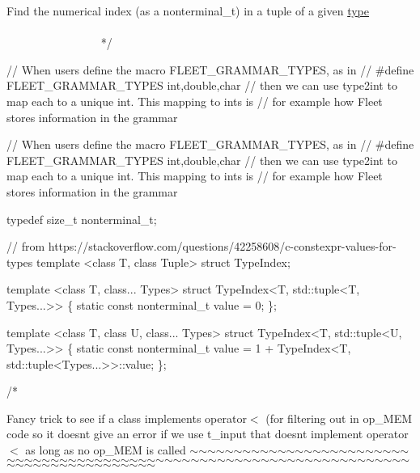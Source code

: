 \begin{DoxyCode}
    Find the numerical index (as a nonterminal\_t) in a tuple of a given \hyperlink{structhas__operator__lessthan__impl_a94158125949ce4db0eefedbdc4cbad73}{type}
   ~~~~~~~~~~~~~~~~~~~~~~~~~~~~~~~~~~~~~~~~~~~~~~~~~~~~~~~~~~~~~~~~~~~~~~~~~~~~~~~~~~~~~~~~ */

\textcolor{comment}{// When users define the macro FLEET\_GRAMMAR\_TYPES, as in }
\textcolor{comment}{// #define FLEET\_GRAMMAR\_TYPES int,double,char}
\textcolor{comment}{// then we can use type2int to map each to a unique int. This mapping to ints is}
\textcolor{comment}{// for example how Fleet stores information in the grammar}

\textcolor{comment}{// When users define the macro FLEET\_GRAMMAR\_TYPES, as in }
\textcolor{comment}{// #define FLEET\_GRAMMAR\_TYPES int,double,char}
\textcolor{comment}{// then we can use type2int to map each to a unique int. This mapping to ints is}
\textcolor{comment}{// for example how Fleet stores information in the grammar}

\textcolor{keyword}{typedef} \textcolor{keywordtype}{size\_t} nonterminal\_t;

\textcolor{comment}{// from https://stackoverflow.com/questions/42258608/c-constexpr-values-for-types}
\textcolor{keyword}{template} <\textcolor{keyword}{class} T, \textcolor{keyword}{class} Tuple>
\textcolor{keyword}{struct }TypeIndex;

\textcolor{keyword}{template} <\textcolor{keyword}{class }T, \textcolor{keyword}{class}... Types>
\textcolor{keyword}{struct }TypeIndex<T, std::tuple<T, Types...>> \{
    \textcolor{keyword}{static} \textcolor{keyword}{const} nonterminal\_t value = 0;
\};

\textcolor{keyword}{template} <\textcolor{keyword}{class }T, \textcolor{keyword}{class }U, \textcolor{keyword}{class}... Types>
\textcolor{keyword}{struct }TypeIndex<T, std::tuple<U, Types...>> \{
    \textcolor{keyword}{static} \textcolor{keyword}{const} nonterminal\_t value = 1 + TypeIndex<T, std::tuple<Types...>>::value;
\};

\textcolor{comment}{/*}
\end{DoxyCode}
 Fancy trick to see if a class implements operator$<$ (for filtering out in op\+\_\+\+M\+EM code so it doesn\textquotesingle{}t give an error if we use t\+\_\+input that doesn\textquotesingle{}t implement operator$<$ as long as no op\+\_\+\+M\+EM is called $\sim$$\sim$$\sim$$\sim$$\sim$$\sim$$\sim$$\sim$$\sim$$\sim$$\sim$$\sim$$\sim$$\sim$$\sim$$\sim$$\sim$$\sim$$\sim$$\sim$$\sim$$\sim$$\sim$$\sim$$\sim$$\sim$$\sim$$\sim$$\sim$$\sim$$\sim$$\sim$$\sim$$\sim$$\sim$$\sim$$\sim$$\sim$$\sim$$\sim$$\sim$$\sim$$\sim$$\sim$$\sim$$\sim$$\sim$$\sim$$\sim$$\sim$$\sim$$\sim$$\sim$$\sim$$\sim$$\sim$$\sim$$\sim$$\sim$$\sim$$\sim$$\sim$$\sim$$\sim$$\sim$$\sim$$\sim$$\sim$$\sim$$\sim$$\sim$$\sim$$\sim$$\sim$$\sim$$\sim$$\sim$$\sim$$\sim$$\sim$$\sim$$\sim$$\sim$$\sim$$\sim$$\sim$$\sim$$\sim$ 

